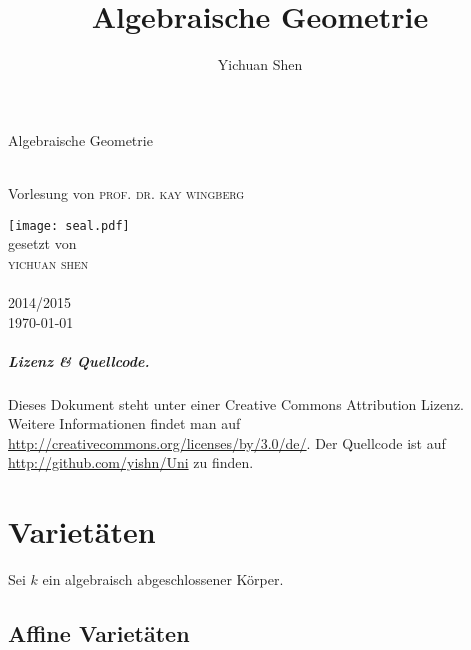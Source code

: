 \documentclass[11pt,b5paper,openany]{memoir}
\author{Yichuan Shen}
\title{Algebraische Geometrie}
\begin{document}
\frontmatter
{}

\begin{center}
\vspace*{0cm}
\vfill {
    \begin{Huge}Algebraische Geometrie\end{Huge}\\
    \vspace{1mm}
    Vorlesung von \textsc{prof. dr. kay wingberg}
}
\vfill {
    \texttt{[image: seal.pdf]}\\
    gesetzt von\\\textsc{yichuan shen} \\\ \\
    2014/2015\\
    \today
}
\end{center}

\clearpage

\vspace*{0cm}
\vfill
\paragraph{Lizenz \& Quellcode.} Dieses Dokument steht unter einer Creative Commons Attribution Lizenz. Weitere Informationen findet man auf \url{http://creativecommons.org/licenses/by/3.0/de/}. Der Quellcode ist auf \url{http://github.com/yishn/Uni} zu finden.

\mainmatter
{}
\setcounter{page}{3}
\tableofcontents

\chapter{Varietäten}

Sei $k$ ein algebraisch abgeschlossener Körper.

\section{Affine Varietäten}
\end{document}

